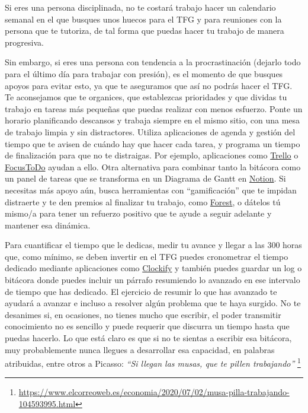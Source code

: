 Si eres una persona disciplinada, no te costará trabajo hacer un calendario semanal en el que busques unos huecos para el TFG y para reuniones con la persona que te tutoriza, de tal forma que puedas hacer tu trabajo de manera progresiva. 

Sin embargo, si eres una persona con tendencia a la procrastinación (dejarlo todo para el último día para trabajar con presión), es el momento de que busques apoyos para evitar esto, ya que te aseguramos que así no podrás hacer el TFG. Te aconsejamos que te organices, que establezcas prioridades y que dividas tu trabajo en tareas más pequeñas que puedas realizar con menos esfuerzo. Ponte un horario planificando descansos y trabaja siempre en el mismo sitio, con una mesa de trabajo limpia y sin distractores. Utiliza aplicaciones de agenda y gestión del tiempo que te avisen de cuándo hay que hacer cada tarea, y programa un tiempo de finalización para que no te distraigas. Por ejemplo, aplicaciones como \href{https://trello.com/}{Trello} o \href{https://www.focustodo.cn/}{FocusToDo} ayudan a ello. Otra alternativa para combinar tanto la bitácora como un panel de tareas que se transforma en un Diagrama de Gantt en \href{https://www.notion.so/}{Notion}. Si necesitas más apoyo aún, busca herramientas con ``gamificación'' que te impidan distraerte y te den premios al finalizar tu trabajo, como \href{https://www.forestapp.cc/}{Forest}, o dátelos tú mismo/a para tener un refuerzo positivo que te ayude a seguir adelante y mantener esa dinámica. 

Para cuantificar el tiempo que le dedicas, medir tu avance y llegar a las 300 horas que, como mínimo, se deben invertir en el TFG puedes cronometrar el tiempo dedicado mediante aplicaciones como \href{https://clockify.me/es/}{Clockify} y también puedes guardar un log o bitácora donde puedes incluir un párrafo resumiendo lo avanzado en ese intervalo de tiempo que has dedicado. El ejercicio de resumir lo que has avanzado te ayudará a avanzar e incluso a resolver algún problema que te haya surgido. No te desanimes si, en ocasiones, no tienes mucho que escribir, el poder transmitir conocimiento no es sencillo y puede requerir que discurra un tiempo hasta que puedas hacerlo. Lo que está claro es que si no te sientas a escribir esa bitácora, muy probablemente nunca llegues a desarrollar esa capacidad, en palabras atribuidas, entre otros a Picasso: {\it ``Si llegan las musas, que te pillen trabajando''} \footnote{\url{https://www.elcorreoweb.es/economia/2020/07/02/musa-pilla-trabajando-104593995.html}}

